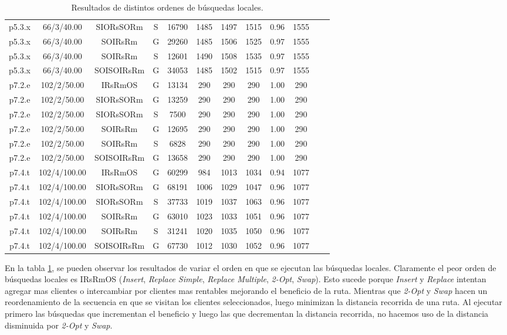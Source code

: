 \begin{table}
\begin{tabular}{ |c|c|c|c|c|c|c|c|c|c|c|c| }
p5.3.x & 66/3/40.00 & SIORsSORm & S & 16790 & 1485 & 1497 & 1515 & 0.96 & 1555 \\
p5.3.x & 66/3/40.00 & SOIRsRm & G & 29260 & 1485 & 1506 & 1525 & 0.97 & 1555 \\
p5.3.x & 66/3/40.00 & SOIRsRm & S & 12601 & 1490 & 1508 & 1535 & 0.97 & 1555 \\
p5.3.x & 66/3/40.00 & SOISOIRsRm & G & 34053 & 1485 & 1502 & 1515 & 0.97 & 1555 \\
p7.2.e & 102/2/50.00 & IRsRmOS & G & 13134 & 290 & 290 & 290 & 1.00 & 290 \\
p7.2.e & 102/2/50.00 & SIORsSORm & G & 13259 & 290 & 290 & 290 & 1.00 & 290 \\
p7.2.e & 102/2/50.00 & SIORsSORm & S & 7500 & 290 & 290 & 290 & 1.00 & 290 \\
p7.2.e & 102/2/50.00 & SOIRsRm & G & 12695 & 290 & 290 & 290 & 1.00 & 290 \\
p7.2.e & 102/2/50.00 & SOIRsRm & S & 6828 & 290 & 290 & 290 & 1.00 & 290 \\
p7.2.e & 102/2/50.00 & SOISOIRsRm & G & 13658 & 290 & 290 & 290 & 1.00 & 290 \\
p7.4.t & 102/4/100.00 & IRsRmOS & G & 60299 & 984 & 1013 & 1034 & 0.94 & 1077 \\
p7.4.t & 102/4/100.00 & SIORsSORm & G & 68191 & 1006 & 1029 & 1047 & 0.96 & 1077 \\
p7.4.t & 102/4/100.00 & SIORsSORm & S & 37733 & 1019 & 1037 & 1063 & 0.96 & 1077 \\
p7.4.t & 102/4/100.00 & SOIRsRm & G & 63010 & 1023 & 1033 & 1051 & 0.96 & 1077 \\
p7.4.t & 102/4/100.00 & SOIRsRm & S & 31241 & 1020 & 1035 & 1050 & 0.96 & 1077 \\
p7.4.t & 102/4/100.00 & SOISOIRsRm & G & 67730 & 1012 & 1030 & 1052 & 0.96 & 1077 \\
\hline
\end{tabular}
\caption{Resultados de distintos ordenes de búsquedas locales.}
\label{tab:secuenciaBusqueda}
\end{table}


En la tabla \ref{tab:secuenciaBusqueda}, se pueden observar los resultados de variar el orden en que se ejecutan las búsquedas locales. Claramente el peor orden de búsquedas locales es IRsRmOS (\textit{Insert}, \textit{Replace Simple}, \textit{Replace Multiple}, \textit{2-Opt}, \textit{Swap}). Esto sucede porque \textit{Insert} y \textit{Replace} intentan agregar mas clientes o intercambiar por clientes mas rentables mejorando el beneficio de la ruta. Mientras que \textit{2-Opt} y \textit{Swap} hacen un reordenamiento de la secuencia en que se visitan los clientes seleccionados, luego minimizan la distancia recorrida de una ruta. Al ejecutar primero las búsquedas que incrementan el beneficio y luego las que decrementan la distancia recorrida, no hacemos uso de la distancia disminuida por \textit{2-Opt} y \textit{Swap}.

